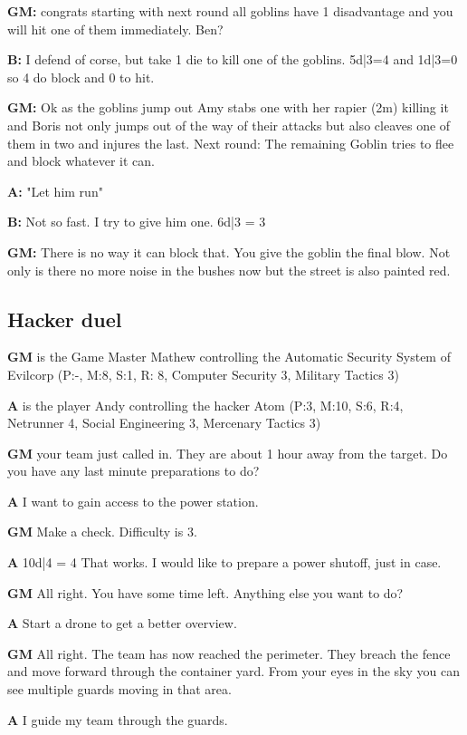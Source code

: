 \documentclass[11pt]{article}
\begin{document}
{\begin{multicols}{2}[]
\textbf{GM:} congrats starting with next round all goblins have 1 disadvantage and you will hit one of them immediately. Ben?

\textbf{B:} I defend of corse, but take 1 die to kill one of the goblins. 5d|3=4 and 1d|3=0 so 4 do block and 0 to hit.

\textbf{GM:} Ok as the goblins jump out Amy stabs one with her rapier (2m) killing it and Boris not only jumps out of the way of their attacks but also cleaves one of them in two and injures the last. Next round: The remaining Goblin tries to flee and block whatever it can.

\textbf{A:} "Let him run"

\textbf{B:} Not so fast. I try to give him one. 6d|3 = 3

\textbf{GM:} There is no way it can block that. You give the goblin the final blow. Not only is there no more noise in the bushes now but the street is also painted red.

\subsection{Hacker duel}
\label{sec:org5735623}

\textbf{GM} is the Game Master Mathew controlling the Automatic Security System of Evilcorp (P:-, M:8, S:1, R: 8, Computer Security 3, Military Tactics 3)

\textbf{A} is the player Andy controlling the hacker Atom (P:3, M:10, S:6, R:4, Netrunner 4, Social Engineering 3, Mercenary Tactics 3)

\textbf{GM} your team just called in. They are about 1 hour away from the target. Do you have any last minute preparations to do?

\textbf{A} I want to gain access to the power station.

\textbf{GM} Make a check. Difficulty is 3.

\textbf{A} 10d|4 = 4 That works. I would like to prepare a power shutoff, just in case.

\textbf{GM} All right. You have some time left. Anything else you want to do?

\textbf{A} Start a drone to get a better overview.

\textbf{GM} All right. The team has now reached the perimeter. They breach the fence and move forward through the container yard. From your eyes in the sky you can see multiple guards moving in that area.

\textbf{A} I guide my team through the guards.


\end{multicols}}
\end{document}
